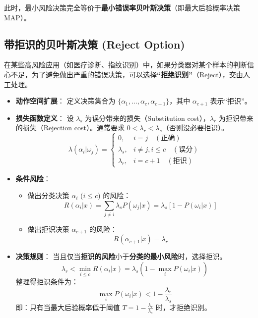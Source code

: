 \documentclass[a4paper, 11pt]{ctexart}
\begin{document}
此时，最小风险决策完全等价于\textbf{最小错误率贝叶斯决策}（即最大后验概率决策 MAP）。

\subsection{带拒识的贝叶斯决策 (Reject Option)}
在某些高风险应用（如医疗诊断、指纹识别）中，如果分类器对某个样本的判断信心不足，为了避免做出严重的错误决策，可以选择\textbf{“拒绝识别”}（Reject），交由人工处理。

\begin{itemize}
    \item \textbf{动作空间扩展}：
    定义决策集合为 $\{\alpha_1, \dots, \alpha_c, \alpha_{c+1}\}$，其中 $\alpha_{c+1}$ 表示“拒识”。
    \item \textbf{损失函数定义}：
    设 $\lambda_s$ 为误分带来的损失（Substitution cost），$\lambda_r$ 为拒识带来的损失（Rejection cost）。通常要求 $0 < \lambda_r < \lambda_s$（否则没必要拒识）。
    \begin{equation}
        \lambda(\alpha_i|\omega_j) = \begin{cases} 
        0, & i=j \quad (\text{正确}) \\
        \lambda_s, & i \neq j, i \le c \quad (\text{误分}) \\
        \lambda_r, & i = c+1 \quad (\text{拒识})
        \end{cases}
    \end{equation}
    \item \textbf{条件风险}：
    \begin{itemize}
        \item 做出分类决策 $\alpha_i$ ($i \le c$) 的风险：
        $$ R(\alpha_i|x) = \sum_{j \neq i} \lambda_s P(\omega_j|x) = \lambda_s [1 - P(\omega_i|x)] $$
        \item 做出拒识决策 $\alpha_{c+1}$ 的风险：
        $$ R(\alpha_{c+1}|x) = \lambda_r $$
    \end{itemize}
    \item \textbf{决策规则}：
    当且仅当\textbf{拒识的风险}小于\textbf{分类的最小风险}时，选择拒识。
    $$ \lambda_r < \min_{i \le c} R(\alpha_i|x) = \lambda_s (1 - \max_i P(\omega_i|x)) $$
    整理得拒识条件为：
    \begin{equation}
        \max_i P(\omega_i|x) < 1 - \frac{\lambda_r}{\lambda_s}
    \end{equation}
    即：只有当最大后验概率低于阈值 $T = 1 - \frac{\lambda_r}{\lambda_s}$ 时，才拒绝识别。
\end{itemize}
\end{document}
